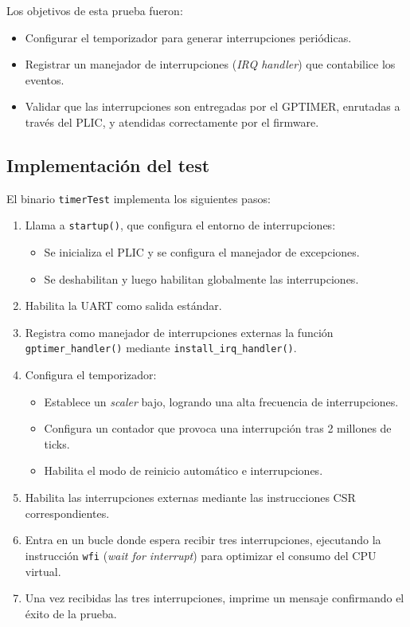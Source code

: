 Los objetivos de esta prueba fueron:

\begin{itemize}
    \item Configurar el temporizador para generar interrupciones periódicas.
    \item Registrar un manejador de interrupciones (\emph{IRQ handler}) que contabilice los eventos.
    \item Validar que las interrupciones son entregadas por el GPTIMER, enrutadas a través del PLIC, y atendidas correctamente por el firmware.
\end{itemize}

\subsection*{Implementación del test}

El binario \texttt{timerTest} implementa los siguientes pasos:

\begin{enumerate}
    \item Llama a \texttt{startup()}, que configura el entorno de interrupciones:
    \begin{itemize}
        \item Se inicializa el PLIC y se configura el manejador de excepciones.
        \item Se deshabilitan y luego habilitan globalmente las interrupciones.
    \end{itemize}
    
    \item Habilita la UART como salida estándar.
    
    \item Registra como manejador de interrupciones externas la función \texttt{gptimer\_handler()} mediante \texttt{install\_irq\_handler()}.
    
    \item Configura el temporizador:
    \begin{itemize}
        \item Establece un \emph{scaler} bajo, logrando una alta frecuencia de interrupciones.
        \item Configura un contador que provoca una interrupción tras 2 millones de ticks.
        \item Habilita el modo de reinicio automático e interrupciones.
    \end{itemize}
    
    \item Habilita las interrupciones externas mediante las instrucciones CSR correspondientes.
    
    \item Entra en un bucle donde espera recibir tres interrupciones, ejecutando la instrucción \texttt{wfi} (\emph{wait for interrupt}) para optimizar el consumo del CPU virtual.
    
    \item Una vez recibidas las tres interrupciones, imprime un mensaje confirmando el éxito de la prueba.
\end{enumerate}

